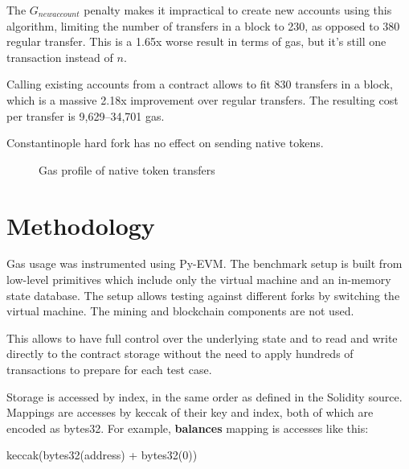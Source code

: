 \documentclass[12pt]{article}
\begin{document}
The $G_{newaccount}$ penalty makes it impractical to create new accounts using this algorithm, limiting the number of transfers in a block to 230, as opposed to 380 regular transfer.
This is a 1.65x worse result in terms of gas, but it's still one transaction instead of $n$.

Calling existing accounts from a contract allows to fit 830 transfers in a block, which is a massive 2.18x improvement over regular transfers.
The resulting cost per transfer is 9,629--34,701 gas.

Constantinople hard fork has no effect on sending native tokens.

\begin{figure}[h!]
\caption{Gas profile of native token transfers}
\end{figure}


\section{Methodology}

Gas usage was instrumented using Py-EVM\cite{pyevm}.
The benchmark setup is built from low-level primitives which include only the virtual machine and an in-memory state database.
The setup allows testing against different forks by switching the virtual machine.
The mining and blockchain components are not used.

This allows to have full control over the underlying state and to read and write directly to the contract storage without the need to apply hundreds of transactions to prepare for each test case.

Storage is accessed by index, in the same order as defined in the Solidity source.
Mappings are accesses by keccak of their key and index, both of which are encoded as bytes32.
For example, \textbf{balances} mapping is accesses like this:
\begin{center}
	keccak(bytes32(address) + bytes32(0))	
\end{center}
\end{document}
